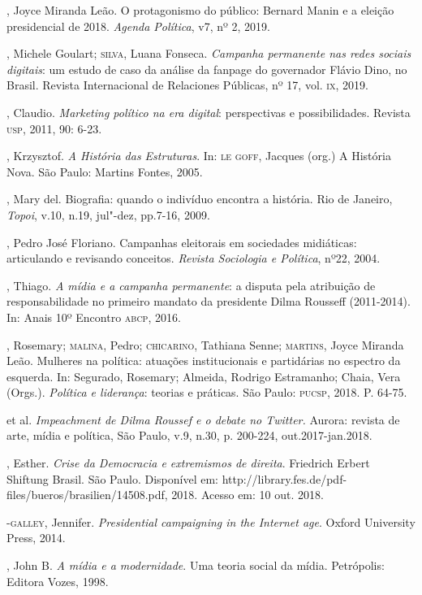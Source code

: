 \begin{bibliohedra}
, Joyce Miranda Leão. O protagonismo do público: Bernard Manin e
a eleição presidencial de 2018. \emph{Agenda Política}, v7, nº 2,
2019.

, Michele Goulart; \textsc{silva}, Luana Fonseca. \emph{Campanha
permanente nas redes sociais digitais}: um estudo de caso da análise da
fanpage do governador Flávio Dino, no Brasil. Revista Internacional de
Relaciones Públicas, nº 17, vol. \textsc{ix}, 2019.

, Claudio. \emph{Marketing político na era digital}:
perspectivas e possibilidades. Revista \textsc{usp}, 2011, 90: 6-23.

, Krzysztof. \emph{A História das Estruturas}. In: \textsc{le} \textsc{goff},
Jacques (org.) A História Nova. São Paulo: Martins Fontes, 2005.

, Mary del. Biografia: quando o indivíduo encontra a história. Rio
de Janeiro, \emph{Topoi}, v.10, n.19, jul"-dez, pp.7-16, 2009.

, Pedro José Floriano. Campanhas eleitorais em sociedades
midiáticas: articulando e revisando conceitos. \emph{Revista
Sociologia e Política}, nº22, 2004.

, Thiago. \emph{A mídia e a campanha permanente}: a disputa
pela atribuição de responsabilidade no primeiro mandato da presidente
Dilma Rousseff (2011-2014). In: Anais 10º Encontro \textsc{abcp}, 2016.

, Rosemary; \textsc{malina}, Pedro; \textsc{chicarino}, Tathiana Senne; \textsc{martins},
Joyce Miranda Leão. Mulheres na política: atuações institucionais e
partidárias no espectro da esquerda. In: Segurado, Rosemary; Almeida,
Rodrigo Estramanho; Chaia, Vera (Orgs.). \emph{Política e liderança}:
teorias e práticas. São Paulo: \textsc{pucsp}, 2018. P. 64-75.

\titidem\mbox{} et al. \emph{Impeachment de Dilma Roussef e o
debate no Twitter.} Aurora: revista de arte, mídia e política, São
Paulo, v.9, n.30, p. 200-224, out.2017-jan.2018.

, Esther. \emph{Crise da Democracia e extremismos de direita}.
Friedrich Erbert Shiftung Brasil. São Paulo. Disponível em:
http://library.fes.de/pdf-files/bueros/brasilien/14508.pdf, 2018. Acesso
em: 10 out. 2018.

-\textsc{galley}, Jennifer. \emph{Presidential campaigning in the
Internet age}. Oxford University Press, 2014.

, John B. \emph{A mídia e a modernidade}. Uma teoria social da
mídia. Petrópolis: Editora Vozes, 1998.
\end{bibliohedra}

